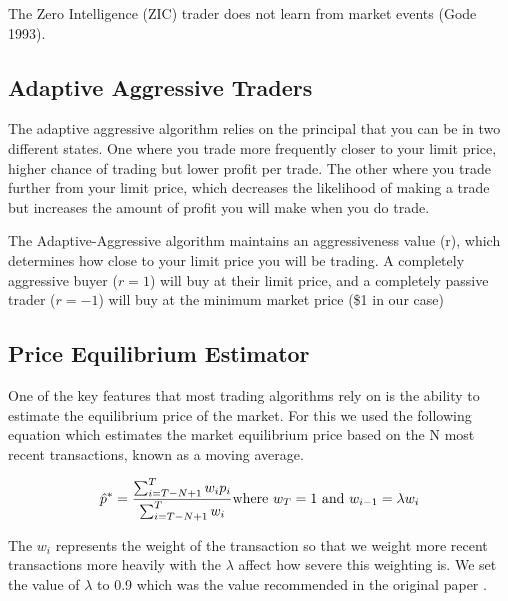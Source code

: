 \documentclass{acm_proc_article-sp}
\begin{document}
The Zero Intelligence (ZIC) trader does not learn from market events (Gode
1993).\\


\pagebreak %
\subsection{Adaptive Aggressive Traders} \label{sec:AA}

The adaptive aggressive algorithm relies on the principal that you can be in
two different states. One where you trade more frequently closer to your limit
price, higher chance of trading but lower profit per trade. The other where you
trade further from your limit price, which decreases the likelihood of making a
trade but increases the amount of profit you will make when you do trade.

The Adaptive-Aggressive algorithm maintains an aggressiveness value (r), which
determines how close to your limit price you will be trading. A completely
aggressive buyer ($r = 1$) will buy at their limit price, and a completely
passive trader ($r = -1$) will buy at the minimum market price (\$1 in our case)
\subsection{Price Equilibrium Estimator}
One of the key features that most trading algorithms rely on is the ability to
estimate the equilibrium price of the market. For this we used the following
equation which estimates the market equilibrium price based on the N most
recent transactions, known as a moving average.

\begin{equation}
\hat p^* = \frac{\sum^T_{i=T-N+1}w_ip_i}{\sum^T_{i=T-N+1}w_i}\\
\text{where $w_T = 1$ and $w_{i-1} = \lambda w_i$}
\label{equest}
\end{equation}

The $w_i$ represents the weight of the transaction so that we weight more
recent transactions more heavily with the $\lambda$ affect how severe this
weighting is. We set the value of $\lambda$ to 0.9 which was the value
recommended in the original paper \cite[p.~100]{AA_thesis}.\\
\end{document}
